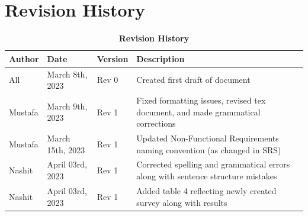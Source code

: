 \documentclass[12pt, titlepage]{article}
\begin{document}
\section{Revision History}
\begin{center}
\begin{table}[H]
\caption{\bf Revision History}
    \begin{tabular}{p{2cm}p{3cm}p{2cm}p{6cm}}
    \hline
    \bf Author & \bf Date & \bf Version & \bf Description\\
    \hline
    All & March 8th, 2023 & Rev 0 & Created first draft of document\\
    \hline
    Mustafa & March 9th, 2023 & Rev 1 & Fixed formatting issues, revised tex document, and made grammatical corrections\\
    \hline
    Mustafa & March 15th, 2023 & Rev 1 & Updated Non-Functional Requirements naming convention (as changed in SRS)\\
    \hline
    Nashit & April 03rd, 2023 & Rev 1 & Corrected spelling and grammatical errors along with sentence structure mistakes\\
    \hline
    Nashit & April 03rd, 2023 & Rev 1 & Added table 4 reflecting newly created survey along with results\\
    \hline
    \end{tabular}
\end{table}
\end{center}
\end{document}
